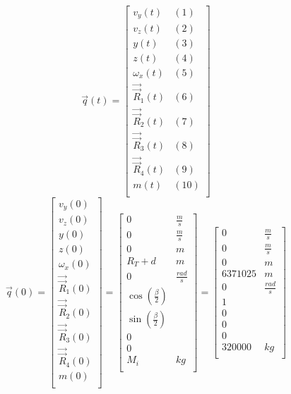 \documentclass{article}
\begin{document}
\begin{equation}
\vec{q}(t) = 
\begin{bmatrix}
    v_y(t) & (1)\\
    v_z(t) & (2)\\
    y(t) & (3)\\
    z(t) & (4)\\
    \omega_x(t) & (5)\\
    \vec{\vec{R}}_1(t) & (6)\\
    \vec{\vec{R}}_2(t) & (7)\\
    \vec{\vec{R}}_3(t) & (8)\\
    \vec{\vec{R}}_4(t) & (9)\\
    m(t) & (10)\\
\end{bmatrix}
\end{equation}
\begin{equation}
\vec{q}(0) = 
\begin{bmatrix}
    v_y(0)  \\
    v_z(0)  \\
    y(0) \\
    z(0) \\
    \omega_x(0) \\
    \vec{\vec{R}}_1(0) \\
    \vec{\vec{R}}_2(0) \\
    \vec{\vec{R}}_3(0) \\
    \vec{\vec{R}}_4(0) \\
    m(0) \\
\end{bmatrix}
=
\begin{bmatrix}
    0 & \frac{m}{s}\\
    0 & \frac{m}{s}\\
    0 & m\\
    R_T + d & m \\
    0 & \frac{rad}{s} \\
    \cos(\frac{\beta}{2}) & \\
    \sin(\frac{\beta}{2}) & \\
    0 & \\
    0 & \\
    M_i & kg \\
\end{bmatrix}
=
\begin{bmatrix}
    0 & \frac{m}{s}\\
    0 & \frac{m}{s}\\
    0 & m\\
    6 371 025 & m \\
    0 & \frac{rad}{s} \\
    1 &  \\
    0 &  \\
    0 & \\
    0 & \\
    320 000 & kg \\
\end{bmatrix}
\end{equation}
\end{document}
